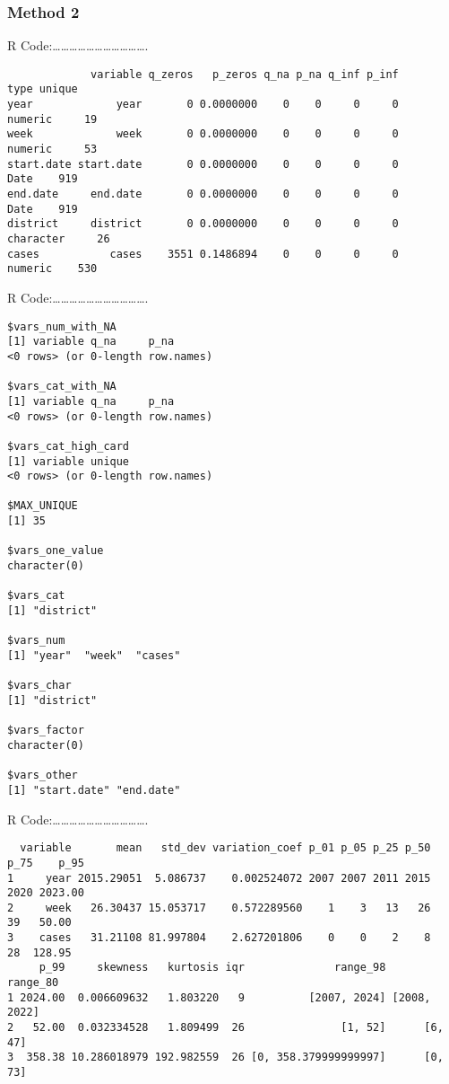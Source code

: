 \documentclass[
  letterpaper,
  DIV=11,
  numbers=noendperiod]{scrreprt}
\begin{document}
\subsubsection{Method 2}\label{method-2}

R
Code:\ldots\ldots\ldots\ldots\ldots\ldots\ldots\ldots\ldots\ldots\ldots.

\begin{verbatim}
             variable q_zeros   p_zeros q_na p_na q_inf p_inf      type unique
year             year       0 0.0000000    0    0     0     0   numeric     19
week             week       0 0.0000000    0    0     0     0   numeric     53
start.date start.date       0 0.0000000    0    0     0     0      Date    919
end.date     end.date       0 0.0000000    0    0     0     0      Date    919
district     district       0 0.0000000    0    0     0     0 character     26
cases           cases    3551 0.1486894    0    0     0     0   numeric    530
\end{verbatim}

R
Code:\ldots\ldots\ldots\ldots\ldots\ldots\ldots\ldots\ldots\ldots\ldots.

\begin{verbatim}
$vars_num_with_NA
[1] variable q_na     p_na    
<0 rows> (or 0-length row.names)

$vars_cat_with_NA
[1] variable q_na     p_na    
<0 rows> (or 0-length row.names)

$vars_cat_high_card
[1] variable unique  
<0 rows> (or 0-length row.names)

$MAX_UNIQUE
[1] 35

$vars_one_value
character(0)

$vars_cat
[1] "district"

$vars_num
[1] "year"  "week"  "cases"

$vars_char
[1] "district"

$vars_factor
character(0)

$vars_other
[1] "start.date" "end.date"  
\end{verbatim}

R
Code:\ldots\ldots\ldots\ldots\ldots\ldots\ldots\ldots\ldots\ldots\ldots.

\begin{verbatim}
  variable       mean   std_dev variation_coef p_01 p_05 p_25 p_50 p_75    p_95
1     year 2015.29051  5.086737    0.002524072 2007 2007 2011 2015 2020 2023.00
2     week   26.30437 15.053717    0.572289560    1    3   13   26   39   50.00
3    cases   31.21108 81.997804    2.627201806    0    0    2    8   28  128.95
     p_99     skewness   kurtosis iqr              range_98     range_80
1 2024.00  0.006609632   1.803220   9          [2007, 2024] [2008, 2022]
2   52.00  0.032334528   1.809499  26               [1, 52]      [6, 47]
3  358.38 10.286018979 192.982559  26 [0, 358.379999999997]      [0, 73]
\end{verbatim}
\end{document}
